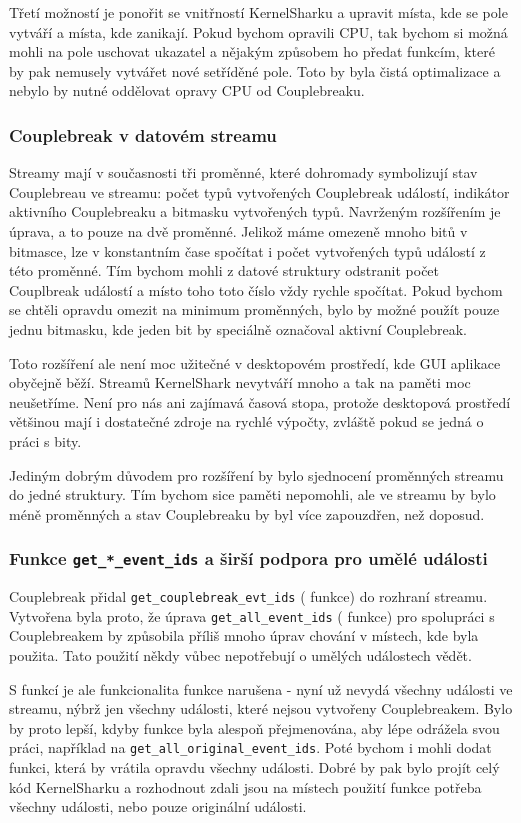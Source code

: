 Třetí možností je ponořit se vnitřností KernelSharku a upravit místa, kde se pole vytváří a místa, kde zanikají. Pokud bychom opravili CPU, tak bychom si možná mohli na pole uschovat ukazatel a nějakým způsobem ho předat funkcím, které by pak nemusely vytvářet nové setříděné pole. Toto by byla čistá optimalizace a nebylo by nutné oddělovat opravy CPU od Couplebreaku.

\subsubsection*{Couplebreak v datovém streamu}
Streamy mají v současnosti tři proměnné, které dohromady symbolizují stav Couplebreau ve streamu: počet typů vytvořených Couplebreak událostí, indikátor aktivního Couplebreaku a bitmasku vytvořených typů. Navrženým rozšířením je úprava, a to pouze na dvě proměnné. Jelikož máme omezeně mnoho bitů v bitmasce, lze v konstantním čase spočítat i počet vytvořených typů událostí z této proměnné. Tím bychom mohli z datové struktury odstranit počet Couplbreak událostí a místo toho toto číslo vždy rychle spočítat. Pokud bychom se chtěli opravdu omezit na minimum proměnných, bylo by možné použít pouze jednu bitmasku, kde jeden bit by speciálně označoval aktivní Couplebreak.

Toto rozšíření ale není moc užitečné v desktopovém prostředí, kde GUI aplikace obyčejně běží. Streamů KernelShark nevytváří mnoho a tak na paměti moc neušetříme. Není pro nás ani zajímavá časová stopa, protože desktopová prostředí většinou mají i dostatečné zdroje na rychlé výpočty, zvláště pokud se jedná o práci s bity.

Jediným dobrým důvodem pro rozšíření by bylo sjednocení proměnných streamu do jedné struktury. Tím bychom sice paměti nepomohli, ale ve streamu by bylo méně proměnných a stav Couplebreaku by byl více zapouzdřen, než doposud.

\subsubsection*{Funkce \texttt{get\_*\_event\_ids} a širší podpora pro umělé události}
Couplebreak přidal \texttt{get\_couplebreak\_evt\_ids} ( funkce) do rozhraní streamu. Vytvořena byla proto, že úprava \texttt{get\_all\_event\_ids} ( funkce) pro spolupráci s Couplebreakem by způsobila příliš mnoho úprav chování v místech, kde byla použita. Tato použití někdy vůbec nepotřebují o umělých událostech vědět.

S  funkcí je ale funkcionalita  funkce narušena - nyní už nevydá všechny události ve streamu, nýbrž jen všechny události, které nejsou vytvořeny Couplebreakem. Bylo by proto lepší, kdyby  funkce byla alespoň přejmenována, aby lépe odrážela svou práci, například na \texttt{get\_all\_original\_event\_ids}. Poté bychom i mohli dodat funkci, která by vrátila opravdu všechny události. Dobré by pak bylo projít celý kód KernelSharku a rozhodnout zdali jsou na místech použití  funkce potřeba všechny události, nebo pouze originální události.

